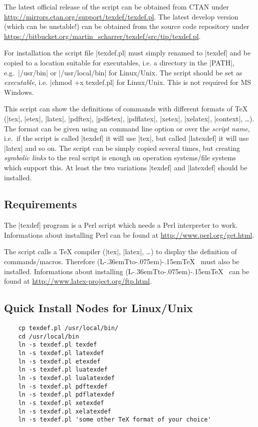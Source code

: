 \documentclass{ydoc}
\makeatletter
\DeclareRobustCommand{\LATeX}{%
    (L\kern -.36em{\sbox \z@ T\vbox to\ht \z@ {\hbox {\check@mathfonts \fontsize \sf@size \z@ \math@fontsfalse \selectfont A}\vss }}\kern -.075em)\kern -.15em\TeX
}
\makeatother
\begin{document}
The latest official release of the script can be obtained from CTAN under \url{http://mirrors.ctan.org/support/texdef/texdef.pl}.
The latest develop version (which can be unstable!) can be obtained from the source code repository under 
\url{https://bitbucket.org/martin_scharrer/texdef/src/tip/texdef.pl}.

For installation the script file |texdef.pl| must simply renamed to |texdef| and be copied to a location suitable for executables,
i.e. a directory in the |PATH|, e.g.\ |/usr/bin| or |/usr/local/bin| for Linux/Unix.
The script should be set as \emph{executable}, i.e. |chmod +x texdef.pl| for Linux/Unix.
This is not required for MS Windows.

This script can show the definitions of commands with different formats of TeX
(|tex|, |etex|, |latex|, |pdftex|, |pdfetex|, |pdflatex|, |xetex|, |xelatex|, |context|, \ldots).
The format can be given using an command line option or over the \emph{script name},
i.e.\ if the script is called |texdef| it will use |tex|, but called |latexdef|
it will use |latex| and so on.
The script can be simply copied several times, but creating \emph{symbolic links}
to the real script is enough on operation systems/file systems which support
this.
At least the two variations |texdef| and |latexdef| should be installed.


\subsection*{Requirements}

The |texdef| program is a Perl script which needs a Perl interpreter to work.
Informations about installing Perl can be found at \url{http://www.perl.org/get.html}.

The script calls a TeX compiler (|tex|, |latex|, \ldots) to display the definition of commands/macros.
Therefore \LATeX\ must also be installed.
Informations about installing \LATeX\ can be found at \url{http://www.latex-project.org/ftp.html}.




\subsection*{Quick Install Nodes for Linux/Unix}

\begin{verbatim}
    cp texdef.pl /usr/local/bin/
    cd /usr/local/bin
    ln -s texdef.pl texdef
    ln -s texdef.pl latexdef
    ln -s texdef.pl etexdef
    ln -s texdef.pl luatexdef
    ln -s texdef.pl lualatexdef
    ln -s texdef.pl pdftexdef
    ln -s texdef.pl pdflatexdef
    ln -s texdef.pl xetexdef
    ln -s texdef.pl xelatexdef
    ln -s texdef.pl 'some other TeX format of your choice'
\end{verbatim}
\end{document}
